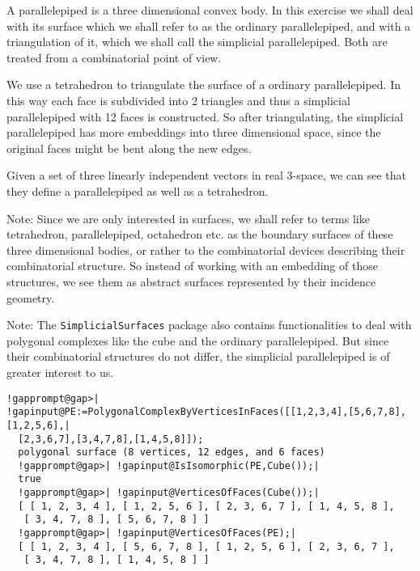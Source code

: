 \documentclass[a4paper,11pt]{report}
\begin{document}
{{ A parallelepiped is a three dimensional convex body. In this exercise we shall
deal with its surface which we shall refer to as the ordinary parallelepiped,
and with a triangulation of it, which we shall call the simplicial
parallelepiped. Both are treated from a combinatorial point of view. 
\begin{center}

\end{center}
 We use a tetrahedron to triangulate the surface of a ordinary parallelepiped.
In this way each face is subdivided into 2 triangles and thus a simplicial
parallelepiped with 12 faces is constructed. So after triangulating, the
simplicial parallelepiped has more embeddings into three dimensional space,
since the original faces might be bent along the new edges. 
\begin{center}

\end{center}
 Given a set of three linearly independent vectors in real 3-space, we can see
that they define a parallelepiped as well as a tetrahedron. 

 Note: Since we are only interested in surfaces, we shall refer to terms like
tetrahedron, parallelepiped, octahedron etc. as the boundary surfaces of these
three dimensional bodies, or rather to the combinatorial devices describing
their combinatorial structure. So instead of working with an embedding of
those structures, we see them as abstract surfaces represented by their
incidence geometry. 
\begin{center}

\end{center}
 Note: The \texttt{SimplicialSurfaces} package also contains functionalities to deal with polygonal complexes like
the cube and the ordinary parallelepiped. But since their combinatorial
structures do not differ, the simplicial parallelepiped is of greater interest
to us. 

 
\begin{Verbatim}[commandchars=!@|,fontsize=\small,frame=single,label=Example]
  !gapprompt@gap>| !gapinput@PE:=PolygonalComplexByVerticesInFaces([[1,2,3,4],[5,6,7,8],[1,2,5,6],|
  [2,3,6,7],[3,4,7,8],[1,4,5,8]]);
  polygonal surface (8 vertices, 12 edges, and 6 faces)  
  !gapprompt@gap>| !gapinput@IsIsomorphic(PE,Cube());|
  true
  !gapprompt@gap>| !gapinput@VerticesOfFaces(Cube());|
  [ [ 1, 2, 3, 4 ], [ 1, 2, 5, 6 ], [ 2, 3, 6, 7 ], [ 1, 4, 5, 8 ], 
   [ 3, 4, 7, 8 ], [ 5, 6, 7, 8 ] ]
  !gapprompt@gap>| !gapinput@VerticesOfFaces(PE);|
  [ [ 1, 2, 3, 4 ], [ 5, 6, 7, 8 ], [ 1, 2, 5, 6 ], [ 2, 3, 6, 7 ], 
   [ 3, 4, 7, 8 ], [ 1, 4, 5, 8 ] ]
\end{Verbatim}
 

}}
\end{document}
